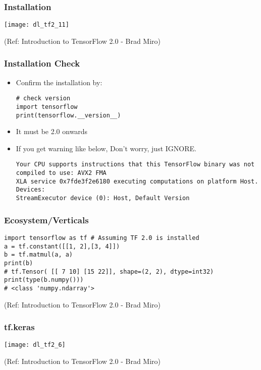 \begin{frame}[fragile] \frametitle{Installation}

\begin{center}
\texttt{[image: dl\_tf2\_11]}
\end{center}


\tiny{(Ref: Introduction to TensorFlow 2.0 - Brad Miro)}
\end{frame}

\begin{frame}[fragile] \frametitle{Installation Check}

\begin{itemize}
\item Confirm the installation by:
\begin{lstlisting}
# check version
import tensorflow
print(tensorflow.__version__)
\end{lstlisting}
\item It must be 2.0 onwards
\item If you get warning like below, Don't worry, just IGNORE.
\begin{lstlisting}
Your CPU supports instructions that this TensorFlow binary was not compiled to use: AVX2 FMA
XLA service 0x7fde3f2e6180 executing computations on platform Host. Devices:
StreamExecutor device (0): Host, Default Version
\end{lstlisting}

\end{itemize}

\end{frame}

\begin{frame}[fragile] \frametitle{Ecosystem/Verticals}

\begin{lstlisting}
import tensorflow as tf # Assuming TF 2.0 is installed
a = tf.constant([[1, 2],[3, 4]])
b = tf.matmul(a, a)
print(b) 
# tf.Tensor( [[ 7 10] [15 22]], shape=(2, 2), dtype=int32)
print(type(b.numpy()))
# <class 'numpy.ndarray'>
\end{lstlisting}


\tiny{(Ref: Introduction to TensorFlow 2.0 - Brad Miro)}
\end{frame}

\begin{frame}[fragile] \frametitle{tf.keras}

\begin{center}
\texttt{[image: dl\_tf2\_6]}
\end{center}


\tiny{(Ref: Introduction to TensorFlow 2.0 - Brad Miro)}
\end{frame}

